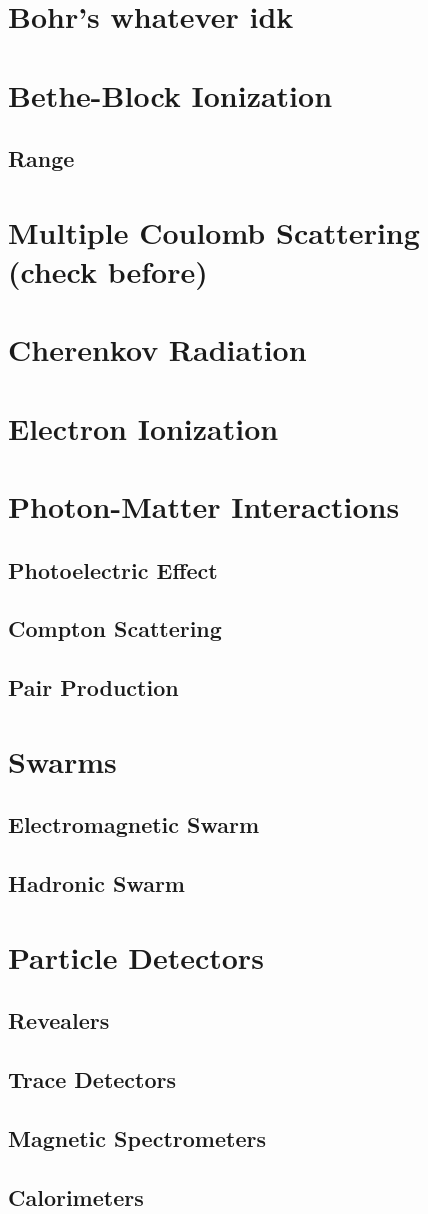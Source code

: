 \documentclass[../qm.tex]{subfiles}
\begin{document}
\section{Bohr's whatever idk}
\section{Bethe-Block Ionization}
\subsection{Range}
\section{Multiple Coulomb Scattering (check before)}
\section{Cherenkov Radiation}
\section{Electron Ionization}
\section{Photon-Matter Interactions}
\subsection{Photoelectric Effect}
\subsection{Compton Scattering}
\subsection{Pair Production}
\section{Swarms}
\subsection{Electromagnetic Swarm}
\subsection{Hadronic Swarm}
\section{Particle Detectors}
\subsection{Revealers}
\subsection{Trace Detectors}
\subsection{Magnetic Spectrometers}
\subsection{Calorimeters}
\end{document}
